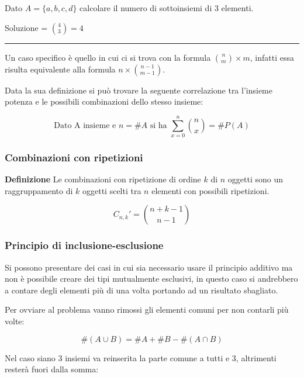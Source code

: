 \documentclass{article}
\begin{document}
\noindent Dato $A=\{a,b,c,d\}$ calcolare il numero di sottoinsiemi di 3 elementi.\newline

\noindent Soluzione = $\binom{4}{3}=4$\newline\rule{\textwidth}{0.5pt}

\vspace{5pt}

\noindent Un caso specifico è quello in cui ci si trova con la formula $\binom{n}{m}\times m$, infatti essa risulta equivalente alla formula $n\times \binom{n-1}{m-1}$.\newline

\noindent Data la sua definizione si può trovare la seguente correlazione tra l'insieme potenza e le possibili combinazioni dello stesso insieme:

$$\text{Dato A insieme e } n=\#A \text{ si ha } \sum_{x=0}^n \binom{n}{x} = \#P(A)$$

\subsubsection{Combinazioni con ripetizioni}

\textbf{Definizione} Le combinazioni con ripetizione di ordine $k$ di $n$ oggetti sono un raggruppamento di
$k$ oggetti scelti tra $n$ elementi con possibili ripetizioni.

$$C_{n,k}'=\binom{n+k-1}{n-1}$$

\subsubsection{Principio di inclusione-esclusione}

Si possono presentare dei casi in cui sia necessario usare il principio additivo ma non è possibile creare dei tipi mutualmente esclusivi, in questo caso si andrebbero a contare degli elementi più di una volta portando ad un risultato sbagliato.\newline

\noindent Per ovviare al problema vanno rimossi gli elementi comuni per non contarli più volte:

$$\#(A\cup B) = \#A+\#B-\#(A\cap B)$$\newline

\noindent Nel caso siano 3 insiemi va reinserita la parte comune a tutti e 3, altrimenti resterà fuori dalla somma:

\vspace{-8pt}
\end{document}
